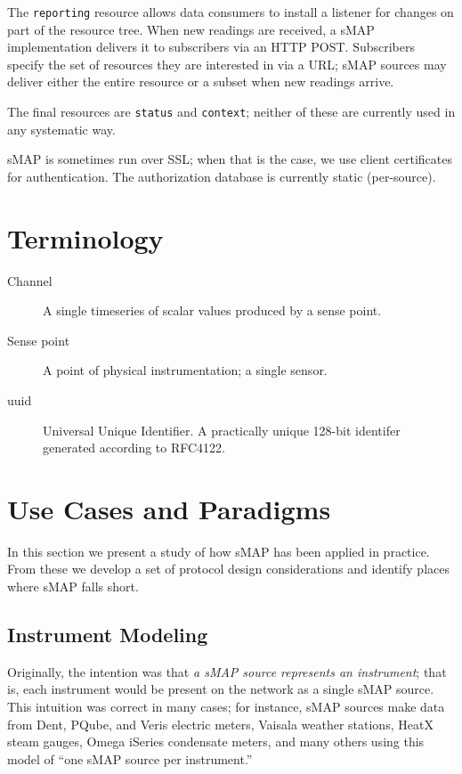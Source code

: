 \documentclass[10pt,letterpaper]{article}
\newcommand{\smap}{sMAP}
\begin{document}
The {\tt reporting} resource allows data consumers to install a listener for
changes on part of the resource tree.  When new readings are received, a
\smap{} implementation delivers it to subscribers via an HTTP POST.
Subscribers specify the set of resources they are interested in via a URL;
\smap{} sources may deliver either the entire resource or a subset when new
readings arrive.  

The final resources are {\tt status} and {\tt context}; neither of these are
currently used in any systematic way.

\smap{} is sometimes run over SSL; when that is the case, we use client
certificates for authentication.  The authorization database is currently
static (per-source).

\section{Terminology}

\begin{description}
\item[Channel] A single timeseries of scalar values produced by a sense point.
\item[Sense point] A point of physical instrumentation; a single sensor.
\item[uuid] Universal Unique Identifier.  A practically unique 128-bit
  identifer generated according to RFC4122.
\end{description}

\section{Use Cases and Paradigms}
\label{sec:uses}

In this section we present a study of how sMAP has been applied in practice.
From these we develop a set of protocol design considerations and
identify places where sMAP falls short.

\subsection{Instrument Modeling}
Originally, the intention was that {\it a sMAP source represents an
  instrument}; that is, each instrument would be present on the network as a
single sMAP source.  This intuition was correct in many cases; for instance,
sMAP sources make data from Dent, PQube, and Veris electric meters, Vaisala
weather stations, HeatX steam gauges, Omega iSeries condensate meters, and
many others using this model of ``one \smap{} source per instrument.''
\end{document}
